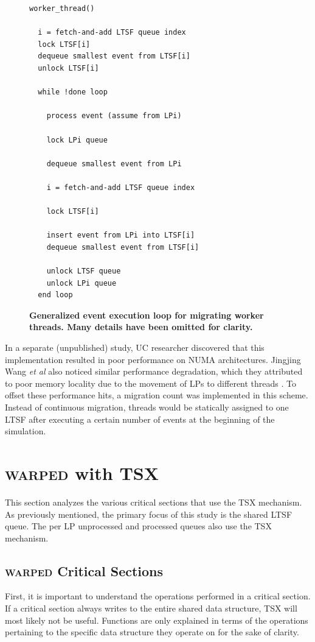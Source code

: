 \documentclass[11pt]{book}
\begin{document}
\begin{figure}
\begin{verbatim}
worker_thread()

  i = fetch-and-add LTSF queue index
  lock LTSF[i]
  dequeue smallest event from LTSF[i]
  unlock LTSF[i]

  while !done loop

    process event (assume from LPi)

    lock LPi queue
    
    dequeue smallest event from LPi

    i = fetch-and-add LTSF queue index

    lock LTSF[i]

    insert event from LPi into LTSF[i]
    dequeue smallest event from LTSF[i]

    unlock LTSF queue
    unlock LPi queue
  end loop
\end{verbatim}
\caption{\textbf{Generalized event execution loop for migrating worker threads.  Many
    details have been omitted for clarity.}}\label{migratinWorkerThreadAlgorithm}
\end{figure}

In a separate (unpublished) study, UC researcher discovered that this implementation
resulted in poor performance on NUMA architectures.  Jingjing Wang \emph{et al} also
noticed similar performance degradation, which they attributed to poor memory locality due
to the movement of LPs to different threads \cite{numa}.  To offset these performance
hits, a migration count was implemented in this scheme.  Instead of continuous migration,
threads would be statically assigned to one LTSF after executing a certain number of
events at the beginning of the simulation.


\chapter{\textsc{warped} with TSX}

This section analyzes the various critical sections that use the TSX mechanism.
As previously mentioned, the primary focus of this study is the shared LTSF
queue.  The per LP unprocessed and processed queues also use the TSX mechanism.

\section{\textsc{warped} Critical Sections}

First, it is important to understand the operations performed in a critical
section.  If a critical section always writes to the entire shared data
structure, TSX will most likely not be useful.  Functions are only explained in
terms of the operations pertaining to the specific data structure they operate
on for the sake of clarity.  
\end{document}
